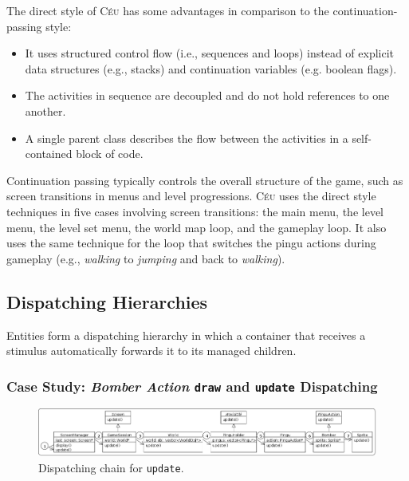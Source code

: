 \documentclass{vgtc}                          %
\newcommand{\CEU}{\textsc{C\'{e}u}\xspace}
\newcommand{\code}[1] {{\small{\texttt{#1}}}}
\newcommand{\Code}[1] {{\texttt{#1}}}
\begin{document}
The direct style of \CEU has some advantages in comparison to the 
continuation-passing style:
%
\begin{itemize}
\item It uses structured control flow (i.e., sequences and loops) instead of 
      explicit data structures (e.g., stacks) and continuation variables (e.g.
      boolean flags).
\item The activities in sequence are decoupled and do not hold references to
      one another. %
\item A single parent class describes the flow between the activities in a 
      self-contained block of code. %
\end{itemize}

Continuation passing typically controls the overall structure of the game,
such as screen transitions in menus and level progressions.
%
\CEU uses the direct style techniques in five cases involving screen
transitions:
the main menu, the level menu, the level set menu, the world map loop, and
the gameplay loop.
%
It also uses the same technique for the loop that switches the pingu actions
during gameplay (e.g., \emph{walking} to \emph{jumping} and back to
\emph{walking}).

\subsection{Dispatching Hierarchies}
\label{sec.pats.dispatching}

    Entities form a dispatching hierarchy in which a container that receives a
    stimulus automatically forwards it to its managed children.

\subsubsection{Case Study: \emph{Bomber Action} \Code{draw} and \Code{update} Dispatching}

\begin{figure}[t]
\centering
\includegraphics[width=\textwidth]{hierarchy}
\caption{Dispatching chain for \code{update}.
\label{fig.hier}
}
\end{figure}
\end{document}
